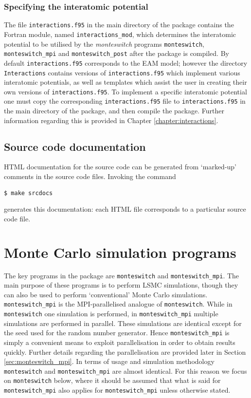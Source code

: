 \documentclass{report}
\begin{document}
\subsection{Specifying the interatomic potential}\label{sec:plugins}
The file \texttt{interactions.f95} in the main directory of the package contains the Fortran module, named \texttt{interactions\_mod}, which
determines the interatomic potential to be utilised by the \emph{monteswitch} programs \texttt{monteswitch}, \texttt{monteswitch\_mpi} and
\texttt{monteswitch\_post} after the package is compiled. 
%
By default \texttt{interactions.f95} corresponds to the EAM model; however the directory  \texttt{Interactions} contains versions of 
\texttt{interactions.f95} which implement various interatomic potentials, as well as templates which assist the user in creating their own
versions of \texttt{interactions.f95}. 
%
To implement a specific interatomic potential one must copy the corresponding \texttt{interactions.f95} file to \texttt{interactions.f95} 
in the main directory of the package, and then compile the package. Further information regarding this is provided in Chapter \ref{chapter:interactions}.


\section{Source code documentation}
HTML documentation for the source code can be generated from `marked-up' comments in the source code files. Invoking the command 
\begin{verbatim}
$ make srcdocs
\end{verbatim}
generates this documentation: each HTML file corresponds to a particular source code file.


\chapter{Monte Carlo simulation programs}\label{chapter:simulation_programs}
The key programs in the package are \texttt{monteswitch} and \texttt{monteswitch\_mpi}.
The main purpose of these programs is to perform LSMC simulations, though they can also
be used to perform `conventional' Monte Carlo simulations. \texttt{monteswitch\_mpi} is the MPI-parallelised analogue of \texttt{monteswitch}. 
While in \texttt{monteswitch} one simulation is performed, in \texttt{monteswitch\_mpi} multiple simulations are 
performed in parallel. These simulations are identical except for the seed used for the random number generator. Hence \texttt{monteswitch\_mpi}
is simply a convenient means to exploit parallelisation in order to obtain results quickly. Further details regarding the parallelisation
are provided later in Section \ref{sec:monteswitch_mpi}.
%
In terms of usage and simulation methodology \texttt{monteswitch} and \texttt{monteswitch\_mpi} are almost identical. For this reason we 
focus on \texttt{monteswitch} below, where it should be assumed that what is said for \texttt{monteswitch\_mpi} also applies for
\texttt{monteswitch\_mpi} unless otherwise stated.
\end{document}
